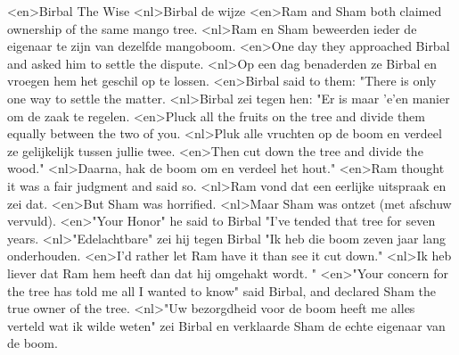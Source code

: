 <en>Birbal The Wise
<nl>Birbal de wijze
<en>Ram and Sham both claimed ownership of the same mango tree.
<nl>Ram en Sham beweerden ieder de eigenaar te zijn van dezelfde mangoboom.
<en>One day they approached Birbal and asked him to settle the dispute.
<nl>Op een dag benaderden ze Birbal en vroegen hem het geschil op te lossen.
<en>Birbal said to them: "There is only one way to settle the matter.
<nl>Birbal zei tegen hen: "Er is maar 'e'en manier om de zaak te regelen.
<en>Pluck all the fruits on the tree and divide them equally between the two of you.
<nl>Pluk alle vruchten op de boom en verdeel ze gelijkelijk tussen jullie twee.
<en>Then cut down the tree and divide the wood."
<nl>Daarna, hak de boom om en verdeel het hout."
<en>Ram thought it was a fair judgment and said so.
<nl>Ram vond dat een eerlijke uitspraak en zei dat.
<en>But Sham was horrified.
<nl>Maar Sham was ontzet (met afschuw vervuld).
<en>"Your Honor" he said to Birbal "I've tended that tree for seven years.
<nl>"Edelachtbare" zei hij tegen Birbal "Ik heb die boom zeven jaar lang onderhouden.
<en>I'd rather let Ram have it than see it cut down."
<nl>Ik heb liever dat Ram hem heeft dan dat hij omgehakt wordt. "
<en>"Your concern for the tree has told me all I wanted to know" said Birbal, and declared Sham the true owner of the tree.
<nl>"Uw bezorgdheid voor de boom heeft me alles verteld wat ik wilde weten" zei Birbal en verklaarde  Sham de echte eigenaar van de boom.
